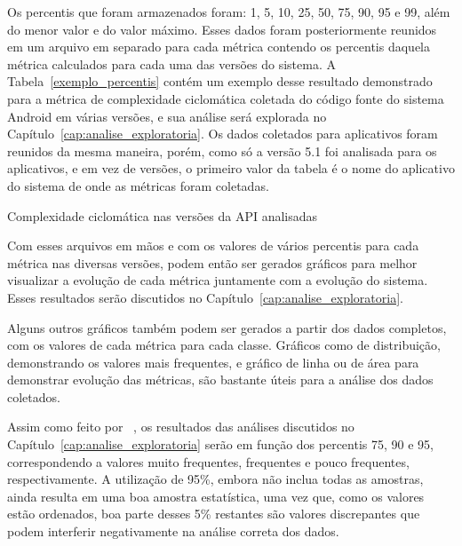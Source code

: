 Os percentis que foram armazenados foram: 1, 5, 10, 25, 50, 75, 90, 95 e 99, além do menor valor e do valor máximo. Esses dados foram posteriormente reunidos em um arquivo em separado para cada métrica contendo os percentis daquela métrica calculados para cada uma das versões do sistema. A Tabela~\ref{exemplo_percentis} contém um exemplo desse resultado demonstrado para a métrica de complexidade ciclomática coletada do código fonte do sistema Android em várias versões, e sua análise será explorada no Capítulo~\ref{cap:analise_exploratoria}. Os dados coletados para aplicativos foram reunidos da mesma maneira, porém, como só a versão 5.1 foi analisada para os aplicativos, e em vez de versões, o primeiro valor da tabela é o nome do aplicativo do sistema de onde as métricas foram coletadas.

\begin{table}[!htb]
\centering
{}

\caption{Complexidade ciclomática nas versões da API analisadas}
\label{exemplo_percentis}
\end{table} 

Com esses arquivos em mãos e com os valores de vários percentis para cada métrica nas diversas versões, podem então ser gerados gráficos para melhor visualizar a evolução de cada métrica juntamente com a evolução do sistema. Esses resultados serão discutidos no Capítulo~\ref{cap:analise_exploratoria}.

Alguns outros gráficos também podem ser gerados a partir dos dados completos, com os valores de cada métrica para cada classe. Gráficos como de distribuição, demonstrando os valores mais frequentes, e gráfico de linha ou de área para demonstrar evolução das métricas, são bastante úteis para a análise dos dados coletados. 

Assim como feito por ~, os resultados das análises discutidos no Capítulo~\ref{cap:analise_exploratoria} serão em função dos percentis 75, 90 e 95, correspondendo a valores muito frequentes, frequentes e pouco frequentes, respectivamente. A utilização de 95\%, embora não inclua todas as amostras, ainda resulta em uma boa amostra estatística, uma vez que, como os valores estão ordenados, boa parte desses 5\% restantes são valores discrepantes que podem interferir negativamente na análise correta dos dados.

